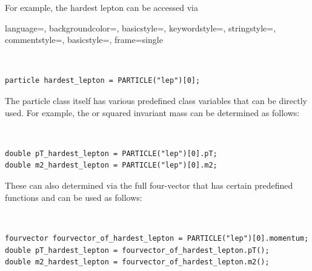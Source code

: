 \documentclass[english,11pt]{article}
\begin{document}
For example, the hardest lepton can be accessed via



 {
language=,
backgroundcolor=,
basicstyle=,
keywordstyle=,
stringstyle=,
commentstyle=,
basicstyle=\scriptsize,
frame=single
}


{\tt
\begin{lstlisting}                                                                                                                                                                                                                                                             
particle hardest_lepton = PARTICLE("lep")[0];
\end{lstlisting}
}

The particle class itself has various predefined class variables that can be directly used. For example,
the \pt{} or squared invariant mass can be determined as follows:

{\tt
\begin{lstlisting}                                                                                                                                                                                                                                                             
double pT_hardest_lepton = PARTICLE("lep")[0].pT;
double m2_hardest_lepton = PARTICLE("lep")[0].m2;
\end{lstlisting}
}

These can also determined via the full four-vector that has certain predefined functions and can be used as follows:

{\tt
\begin{lstlisting}                                                                                                                                                                                                                                                             
fourvector fourvector_of_hardest_lepton = PARTICLE("lep")[0].momentum;
double pT_hardest_lepton = fourvector_of_hardest_lepton.pT();
double m2_hardest_lepton = fourvector_of_hardest_lepton.m2();
\end{lstlisting}
}
\end{document}
